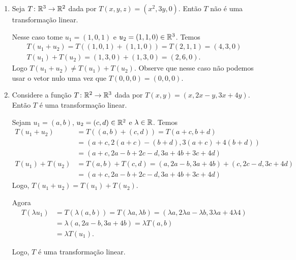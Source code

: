 \begin{exemplo}
\begin{enumerate}[label={\arabic*})]
    \item Seja $T \colon \mathbb{R}^3 \to \mathbb{R}^2$ dada por $T(x, y, z) = (x^2, 3y, 0)$. Então $T$ não é uma transformação linear.
    \begin{solucao}
        Nesse caso tome $u_1 = (1, 0, 1)$ e $u_2 = (1, 1, 0) \in \mathbb{R}^3$. Temos
        \begin{align*}
            T(u_1 + u_2) = T((1, 0, 1) + (1, 1, 0)) = T(2, 1, 1) = (4, 3, 0)\\
            T(u_1) + T(u_2) = (1, 3, 0) + (1, 3, 0) = (2, 6, 0).
        \end{align*}
        Logo $T(u_1 + u_2) \ne T(u_1) + T(u_2)$. Observe que nesse caso não podemos usar o vetor nulo uma vez que $T(0, 0, 0) = (0, 0, 0)$.
    \end{solucao}

    \item Considere a função $T \colon \mathbb{R}^2 \to \mathbb{R}^3$ dada por $T(x, y) = (x, 2x - y, 3x + 4y)$. Então $T$ é uma transformação linear.
    \begin{solucao}
        Sejam $u_1 = (a, b)$, $u_2 = (c, d) \in \mathbb{R}^2$ e $\lambda \in \mathbb{R}$. Temos
        \begin{align*}
            T(u_1 + u_ 2) &= T((a, b) + (c, d)) = T(a + c, b + d) \\ &= (a + c, 2(a + c) - (b + d), 3(a + c) + 4(b + d)) \\ &= (a + c, 2a - b + 2c - d, 3a + 4b + 3c + 4d)\\
            T(u_1) + T(u_2) &= T(a, b) + T(c, d) = (a, 2a - b, 3a + 4b) + (c, 2c - d, 3c + 4d) \\ &= (a + c, 2a - b + 2c - d, 3a + 4b + 3c + 4d)
        \end{align*}
        Logo, $T(u_1 + u_2) = T(u_1) + T(u_2)$.

        Agora
        \begin{align*}
            T(\lambda u_1) &= T(\lambda (a, b)) = T(\lambda a, \lambda b) = (\lambda a, 2\lambda a - \lambda b, 3\lambda a + 4\lambda 4) \\ &= \lambda (a, 2a - b, 3a + 4b) = \lambda T(a, b) \\ &= \lambda T(u_1).
        \end{align*}

        Logo, $T$ é uma transformação linear.
    \end{solucao}


\end{enumerate}
\end{exemplo}

